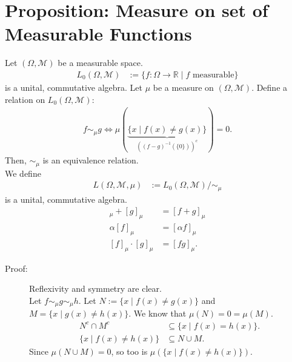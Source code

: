 \documentclass[10pt]{extarticle}
\newcommand{\R}{\mathbb{R}}
\begin{document}
  \section{Proposition: Measure on set of Measurable Functions}%
  Let $(\Omega,\mathcal{M})$ be a measurable space.
  \begin{align*}
    L_0(\Omega,\mathcal{M}) &:= \{f: \Omega \rightarrow \R\mid f\text{ measurable}\}
  \end{align*}
  is a unital, commutative algebra. Let $\mu$ be a measure on $(\Omega,\mathcal{M})$. Define a relation on $L_{0}(\Omega,\mathcal{M})$:
  \begin{align*}
    f\sim_{\mu}g \Leftrightarrow \mu\left(\underbrace{\{x\mid f(x)\neq g(x)\}}_{\left((f-g)^{-1}(\{0\})\right)^{c}}\right) = 0.
  \end{align*}
  Then, $\sim_{\mu}$ is an equivalence relation.\\

  We define
  \begin{align*}
    L(\Omega,\mathcal{M},\mu) &:= L_0(\Omega,\mathcal{M})/\sim_{\mu}
  \end{align*}
  is a unital, commutative algebra.
  \begin{align*}
    [f]_{\mu} + [g]_{\mu} &= [f + g]_{\mu}\\
    \alpha [f]_{\mu} &= [\alpha f]_{\mu}\\
    [f]_{\mu}\cdot[g]_{\mu} &= [fg]_{\mu}.
  \end{align*}
  \begin{description}
    \item[Proof:] Reflexivity and symmetry are clear.\\

      Let $f\sim_{\mu} g \sim_{\mu} h$. Let $N := \{x\mid f(x)\neq g(x)\}$ and $M = \{x\mid g(x)\neq h(x)\}$. We know that $\mu(N) = 0 = \mu(M)$.
      \begin{align*}
        N^{c}\cap M^{c} &\subseteq \{x\mid f(x) = h(x)\}.\\
        \{x\mid f(x)\neq h(x)\} &\subseteq N \cup M.
      \end{align*}
      Since $\mu(N\cup M) = 0$, so too is $\mu\left(\{x\mid f(x)\neq h(x)\}\right)$.
  \end{description}
\end{document}

